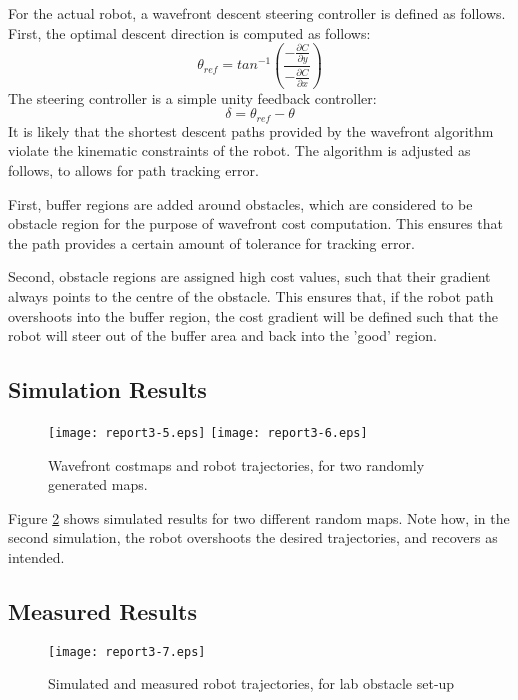 \documentclass{article}
\begin{document}
For the actual robot, a wavefront descent steering controller is defined as
follows. First, the optimal descent direction is computed as follows:
\begin{equation}
  \theta_{ref} = tan^{- 1} ( \frac{- \frac{\partial C}{\partial y}}{-
  \frac{\partial C}{\partial x}})
\end{equation}
The steering controller is a simple unity feedback controller:
\begin{equation}
  \delta = \theta_{ref} - \theta
\end{equation}
It is likely that the shortest descent paths provided by the wavefront
algorithm violate the kinematic constraints of the robot. The algorithm is
adjusted as follows, to allows for path tracking error.

First, buffer regions are added around obstacles, which are considered to be
obstacle region for the purpose of wavefront cost computation. This ensures
that the path provides a certain amount of tolerance for tracking error.

Second, obstacle regions are assigned high cost values, such that their
gradient always points to the centre of the obstacle. This ensures that, if
the robot path overshoots into the buffer region, the cost gradient will be
defined such that the robot will steer out of the buffer area and back into
the 'good' region.

\subsection{Simulation Results}

\begin{figure}[h]
  \texttt{[image: report3-5.eps]} \texttt{[image: report3-6.eps]}
  \label{wave}
  \caption{Wavefront costmaps and robot trajectories, for two randomly
  generated maps.}
\end{figure}

Figure \ref{wave} shows simulated results for two different random maps. Note
how, in the second simulation, the robot overshoots the desired trajectories,
and recovers as intended.

{\newpage}

\subsection{Measured Results}

\begin{figure}[h]
  \texttt{[image: report3-7.eps]} \label{wave}
  \caption{Simulated and measured robot trajectories, for lab obstacle set-up}
\end{figure}
\end{document}
